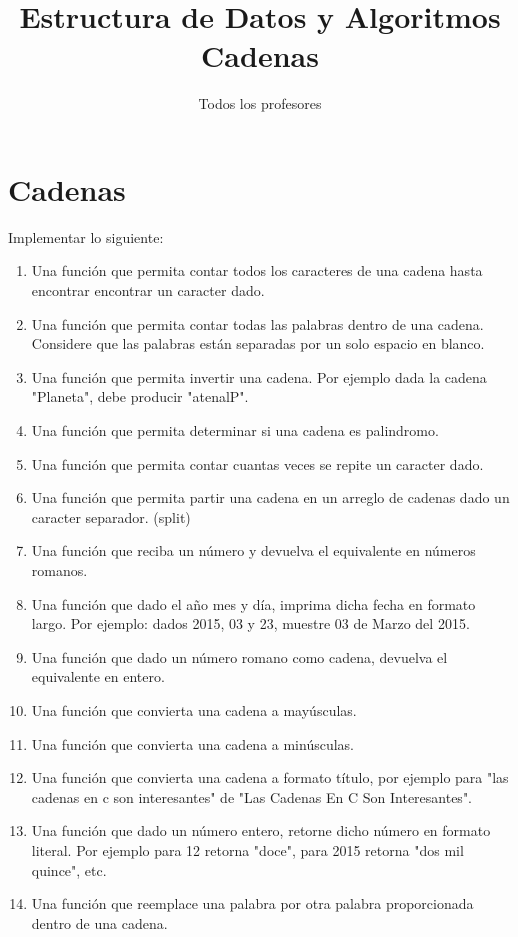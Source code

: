 \documentclass[a4paper]{article}
\title{Estructura de Datos y Algoritmos \\
  \large Cadenas}
\author{Todos los profesores}
\date{\the\year}
\begin{document}
\maketitle

\section{Cadenas}
Implementar lo siguiente:
\begin{enumerate}
  \item Una función que permita contar todos los caracteres de una cadena hasta
    encontrar encontrar un caracter dado.
  \item Una función que permita contar todas las palabras dentro de una cadena.
    Considere que las palabras están separadas por un solo espacio en blanco.
  \item Una función que permita invertir una cadena. Por ejemplo dada la cadena
    "Planeta", debe producir "atenalP".
  \item Una función que permita determinar si una cadena es palindromo.
  \item Una función que permita contar cuantas veces se repite un caracter dado.
  \item Una función que permita partir una cadena en un arreglo de cadenas dado
    un caracter separador. (split)
  \item Una función que reciba un número y devuelva el equivalente en números
    romanos.
  \item Una función que dado el año mes y día, imprima dicha fecha en formato
    largo. Por ejemplo: dados 2015, 03 y 23, muestre 03 de Marzo del 2015.
  \item Una función que dado un número romano como cadena, devuelva el
    equivalente en entero.
  \item Una función que convierta una cadena a mayúsculas.
  \item Una función que convierta una cadena a minúsculas.
  \item Una función que convierta una cadena a formato título, por ejemplo para
    "las cadenas en c son interesantes" de "Las Cadenas En C Son Interesantes".
  \item Una función que dado un número entero, retorne dicho número en formato
    literal. Por ejemplo para 12 retorna "doce", para 2015 retorna "dos mil
    quince", etc.
  \item Una función que reemplace una palabra por otra palabra proporcionada
    dentro de una cadena.
\end{enumerate}
\end{document}
